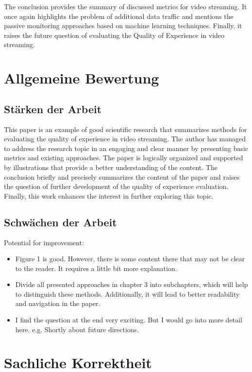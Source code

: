 \documentclass[a4paper,DIV=16]{scrartcl}
\begin{document}
The conclusion provides the summary of discussed metrics for video streaming. It once again highlights the problem of additional data traffic and mentions the passive monitoring approaches based on machine learning techniques. Finally, it raises the future question of evaluating the Quality of Experience in video streaming.


\section*{Allgemeine Bewertung}

\subsection*{Stärken der Arbeit}

This paper is an example of good scientific research that summarizes methods for evaluating the quality of experience in video streaming. The author has managed to address the research topic in an engaging and clear manner by presenting basic metrics and existing approaches. The paper is logically organized and supported by illustrations that provide a better understanding of the content. The conclusion briefly and precisely summarizes the content of the paper and raises the question of further development of the quality of experience evaluation. Finally, this work enhances the interest in further exploring this topic.

\subsection*{Schwächen der Arbeit}

Potential for improvement:

\begin{itemize}
\item Figure 1 is good. However, there is some content there that may not be clear to the reader. It requires a little bit more explanation.
\item Divide all presented approaches in chapter 3 into subchapters, which will help to distinguish these methods. Additionally, it will lead to better readability and navigation in the paper.
\item I find the question at the end very exciting. But I would go into more detail here. e.g. Shortly about future directions.
\end{itemize}  


\section*{Sachliche Korrektheit}
\end{document}
